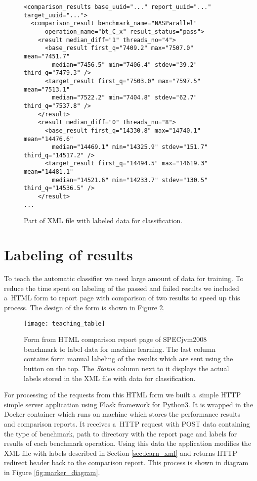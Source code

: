 \begin{figure}
  \small
  \begin{verbatim}
<comparison_results base_uuid="..." report_uuid="..." target_uuid="...">
  <comparison_result benchmark_name="NASParallel"
      operation_name="bt_C_x" result_status="pass">
    <result median_diff="1" threads_no="4">
      <base_result first_q="7409.2" max="7507.0" mean="7451.7"
        median="7456.5" min="7406.4" stdev="39.2" third_q="7479.3" />
      <target_result first_q="7503.0" max="7597.5" mean="7513.1"
        median="7522.2" min="7404.8" stdev="62.7" third_q="7537.8" />
    </result>
    <result median_diff="0" threads_no="8">
      <base_result first_q="14330.8" max="14740.1" mean="14476.6"
        median="14469.1" min="14325.9" stdev="151.7" third_q="14517.2" />
      <target_result first_q="14494.5" max="14619.3" mean="14481.1"
        median="14521.6" min="14233.7" stdev="130.5" third_q="14536.5" />
    </result>
...
  \end{verbatim}
  \normalsize
  \caption{Part of XML file with labeled data for classification.}
  \label{fig:learn_xml}
\end{figure}

\section{Labeling of results}
To teach the automatic classifier we need large amount of data for training. To
reduce the time spent on labeling of the passed and failed results we included
a~HTML form to report page with comparison of two results to speed up this
process. The design of the form is shown in Figure \ref{fig:label_form}.

\begin{figure}
  \centering
  \texttt{[image: teaching\_table]}
  \caption{Form from HTML comparison report page of SPECjvm2008 benchmark to
    label data for machine learning. The last column contains form manual
    labeling of the results which are sent using the button on the top. The
    \emph{Status} column next to it displays the actual labels stored in the XML
    file with data for classification.}
  \label{fig:label_form}
\end{figure}

For processing of the requests from this HTML form we built a~simple HTTP simple
server application using Flask framework for Python3. It is wrapped in the Docker
container which runs on machine which stores the performance results and
comparison reports. It receives a~HTTP request with POST data containing the type of
benchmark, path to directory with the report page and labels for results of each
benchmark operation. Using this data the application modifies the XML file with
labels described in Section \ref{sec:learn_xml} and returns HTTP redirect header
back to the comparison report. This process is shown in diagram in Figure
\ref{fig:marker_diagram}.

